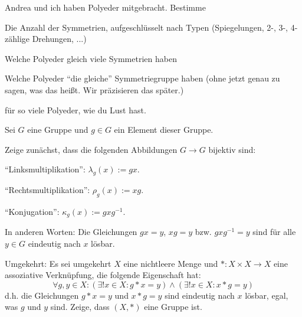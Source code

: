 \begin{sheet}

\begin{problem}
Andrea und ich haben Polyeder mitgebracht. Bestimme
\begin{subproblem}
Die Anzahl der Symmetrien, aufgeschlüsselt nach Typen (Spiegelungen, 2-, 3-, 4-zählige Drehungen, ...)
\end{subproblem}
\begin{subproblem}
Welche Polyeder gleich viele Symmetrien haben
\end{subproblem}
\begin{subproblem}
Welche Polyeder \enquote{die gleiche} Symmetriegruppe haben (ohne jetzt genau zu sagen, was das heißt. Wir präzisieren das später.)
\end{subproblem}
für so viele Polyeder, wie du Lust hast.
\end{problem}

\begin{problem}
Sei $G$ eine Gruppe und $g\in G$ ein Element dieser Gruppe.

Zeige zunächst, dass die folgenden Abbildungen $G\to G$ bijektiv sind:
\begin{subproblem}
\enquote{Linksmultiplikation}: $\lambda_g(x):=gx$.
\end{subproblem}
\begin{subproblem}
\enquote{Rechtsmultiplikation}: $\rho_g(x):=xg$.
\end{subproblem}
\begin{subproblem}
\enquote{Konjugation}: $\kappa_g(x):=gxg^{-1}$.
\end{subproblem}
In anderen Worten: Die Gleichungen $gx=y$, $xg=y$ bzw. $gxg^{-1} = y$ sind für alle $y\in G$ eindeutig nach $x$ lösbar.

\begin{subproblem}[difficulty={mittel}]
Umgekehrt: Es sei umgekehrt $X$ eine nichtleere Menge und $\ast: X\times X\to X$ eine assoziative Verknüpfung, die folgende Eigenschaft hat:
\[\forall g,y\in X: (\exists! x\in X: g \ast x=y) \wedge (\exists! x\in X: x \ast g=y)\]
d.h. die Gleichungen $g \ast x=y$ und $x \ast g=y$ sind eindeutig nach $x$ lösbar, egal, was $g$ und $y$ sind. Zeige, dass $(X,\ast)$ eine Gruppe ist.
\end{subproblem}
\end{problem}


\end{sheet}
